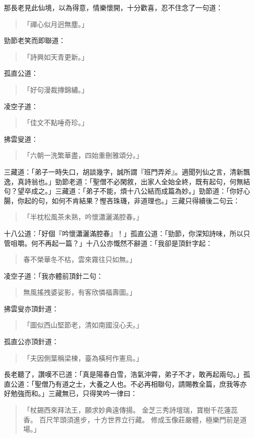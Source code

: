 那長老見此仙境，以為得意，情樂懷開，十分歡喜，忍不住念了一句道：
\begin{quote}
「禪心似月迥無塵。」
\end{quote}

勁節老笑而即聯道：
\begin{quote}
「詩興如天青更新。」
\end{quote}

孤直公道：
\begin{quote}
「好句漫裁摶錦繡。」
\end{quote}

凌空子道：
\begin{quote}
「佳文不點唾奇珍。」
\end{quote}

拂雲叟道：
\begin{quote}
「六朝一洗繁華盡，四始重刪雅頌分。」
\end{quote}

三藏道：「弟子一時失口，胡談幾字，誠所謂『班門弄斧』。適聞列仙之言，清新飄逸，真詩翁也。」勁節老道：「聖僧不必閑敘，出家人全始全終，既有起句，何無結句？望卒成之。」三藏道：「弟子不能，煩十八公結而成篇為妙。」勁節道：「你好心腸，你起的句，如何不肯結果？慳吝珠璣，非道理也。」三藏只得續後二句云：
\begin{quote}
「半枕松風茶未熟，吟懷瀟灑滿腔春。」
\end{quote}

十八公道：「好個『吟懷瀟灑滿腔春』！」孤直公道：「勁節，你深知詩味，所以只管咀嚼。何不再起一篇？」十八公亦慨然不辭道：「我卻是頂針字起：
\begin{quote}
春不榮華冬不枯，雲來霧往只如無。」
\end{quote}

凌空子道：「我亦體前頂針二句：
\begin{quote}
無風搖拽婆娑影，有客欣憐福壽圖。」
\end{quote}

拂雲叟亦頂針道：
\begin{quote}
「圖似西山堅節老，清如南國沒心夫。」
\end{quote}

孤直公亦頂針道：
\begin{quote}
「夫因側葉稱梁棟，臺為橫柯作憲烏。」
\end{quote}

長老聽了，讚嘆不已道：「真是陽春白雪，浩氣沖霄，弟子不才，敢再起兩句。」孤直公道：「聖僧乃有道之士，大養之人也。不必再相聯句，請賜教全篇，庶我等亦好勉強而和。」三藏無已，只得笑吟一律曰：
\begin{quote}
「杖錫西來拜法王，願求妙典遠傳揚。
金芝三秀詩壇瑞，寶樹千花蓮蕊香。
百尺竿頭須進步，十方世界立行藏。
修成玉像莊嚴體，極樂門前是道場。」
\end{quote}

